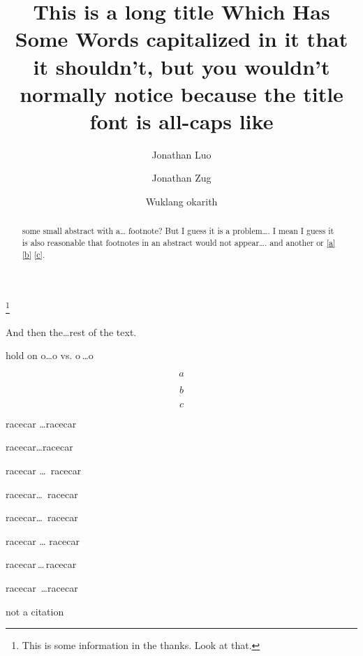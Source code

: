 \documentclass{amsart}
\begin{document}
\title{This is a long title Which Has Some Words capitalized in it that it shouldn't, but you wouldn't normally notice because the title font is all-caps like}
\author{Jonathan Luo}
\address{Gorgeoso luiville and what is you deal; {\normalfont and} sure thing anyway}

\author{Jonathan Zug}
\address{ponderoso squatch and some other stuff, man}

\author{Wuklang okarith}
\address{ostensinobal quickdraw and the principle difference cluster}

\thanks{This is some information in the thanks. Look at that.}


\begin{abstract}
  some small abstract with a\dots{} footnote? But I guess it is a problem\dots. I mean I guess it is also reasonable that footnotes in an abstract would not appear\dots. \cite{thing} and another \cite{thing} or \eqref{a} \eqref{b} \eqref{c}.
\end{abstract}

\maketitle

And then the\dots rest of the text.

hold on o\dots o vs. o\,\dots o

\begin{equation}\label{a}
a
\end{equation}

\begin{equation}\label{b}
b
\end{equation}


\begin{equation}\label{c}
c
\end{equation}

racecar \dots racecar

racecar\dots racecar

racecar \dots\ racecar

racecar\dots\ racecar

racecar\dots\, racecar

racecar \dots\! racecar

racecar\,\dots\,racecar

racecar\, \dots racecar

\begin{thebibliography}{10}
 not a citation
\end{thebibliography}
\end{document}
